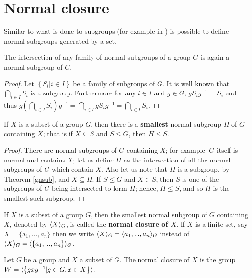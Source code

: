 \section{Normal closure}

Similar to what is done to subgroups (for example in \cite{RotmanITG}) is possible to define normal subgroups generated by a set.

\begin{theorem}
    \label{gnsub}
    The intersection of any family of normal subgroups of a group $G$ is again a normal subgroup of $G$.
\end{theorem}

\begin{proof}
    Let $\left\{ S_i |i \in I \right\}$ be a family of subgroups of $G$. It is well known that $\bigcap_{i \in I} S_i$ is a subgroup. Furthermore for any $i \in I$ and $g \in G$, $gS_ig^{-1} = S_i$ and thus $g(\bigcap_{i \in I} S_i)g^{-1} = \bigcap_{i \in I} gS_ig^{-1} = \bigcap_{i \in I} S_i$.  
\end{proof}

\begin{theorem}
    If $X$ is a subset of a group $G$, then there is a \textbf{smallest} normal subgroup $H$ of $G$ containing $X$; that is if $X \subseteq S$ and $S \le G$, then $H \le S$.   
\end{theorem}

\begin{proof}
    There are normal subgroups of $G$ containing $X$; for example, $G$ itself is normal and contains $X$; let us define $H$ as the intersection of all the normal subgroups of $G$ which contain $X$. Also let us note that $H$ is a subgroup, by Theorem \ref{gnsub}, and $X \subseteq H$. If $S \le G$ and $X \in S$, then $S$ is one of the subgroups of $G$ being intersected to form $H$; hence, $H \le S$, and so $H$ is the smallest such subgroup.
\end{proof}

\begin{definition}
    If $X$ is a subset of a group $G$, then the smallest normal subgroup of $G$ containing $X$, denoted by $\langle X \rangle_G$, is called the \textbf{normal closure of $X$}. If $X$ is a finite set, say $X = \{a_1, ..., a_n \}$ then we write $\langle X \rangle_G = \langle a_1, ..., a_n \rangle_G$ instead of $\langle X \rangle_G = \langle \left\{a_1, ..., a_n\right\} \rangle_G$.
\end{definition}

\begin{theorem}
    Let $G$ be a group and $X$ a subset of $G$. The normal closure of $X$ is the group $W = \langle \left\{gxg^{-1}|g \in G, x \in X\right\} \rangle$. 
\end{theorem}

